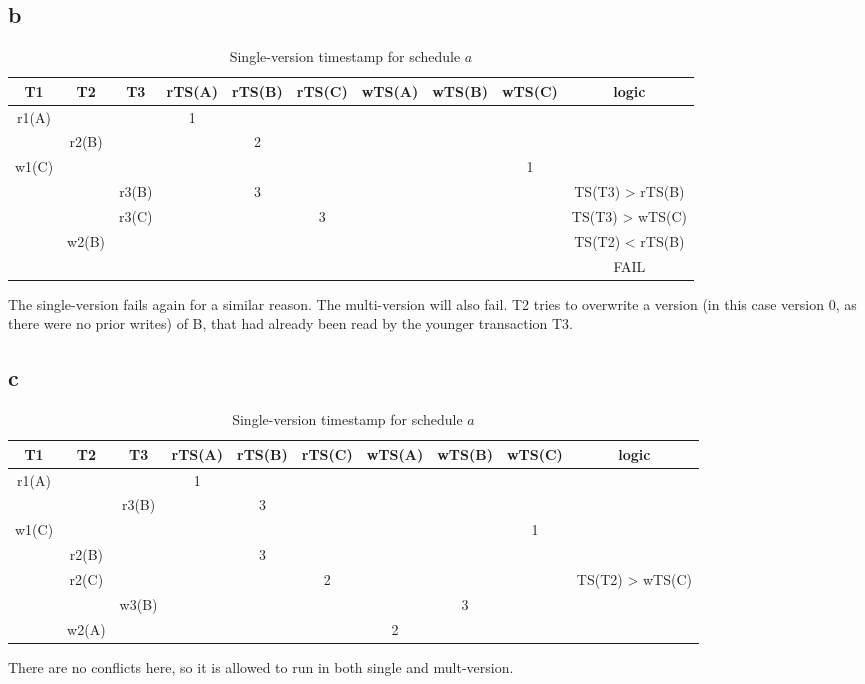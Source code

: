 \documentclass[working, oneside]{../../Preambles/tuftebook}
\begin{document}
\subsection*{b}
 \begin{table}[htpb]
    \centering
    \caption{Single-version timestamp for schedule $a$}
    \label{tab:label}
    \begin{tabular}{c|c|c|c|c|c|c|c|c|c}
        T1 & T2 & T3 & rTS(A) & rTS(B) & rTS(C) &  wTS(A) & wTS(B) & wTS(C) & logic \\ \hline
        r1(A) &  &  & 1 &  &  & & & \\
            & r2(B) &  &  & 2 &  & & &\\
          w1(C)  &  & &  &  &  & & & 1 & \\
                 & &r3(B)  &  & 3 &  & & &  & TS(T3) > rTS(B) \\
          &  & r3(C)&  &  & 3 & & &  & TS(T3) > wTS(C) \\
          & w2(B) & &  &  &  & & &  & TS(T2) < rTS(B) \\
          & & &  &  &  & & &  & FAIL\\
    \end{tabular}
\end{table}
The single-version fails again for a similar reason. The multi-version will also fail. T2 tries to overwrite a version (in this case version 0, as there were no prior writes) of B, that had already been read by the younger transaction T3. 
\subsection*{c}
 \begin{table}[htpb]
    \centering
    \caption{Single-version timestamp for schedule $a$}
    \label{tab:label}
    \begin{tabular}{c|c|c|c|c|c|c|c|c|c}
        T1 & T2 & T3 & rTS(A) & rTS(B) & rTS(C) &  wTS(A) & wTS(B) & wTS(C) & logic \\ \hline
        r1(A) &  &  & 1 &  &  & & & \\
            &  & r3(B)  &   & 3 &  & & &\\
          w1(C)  &  & &  &  &  & & & 1 & \\
                 & r2(B) &  & & 3 &  & & &  & \\
                 & r2(C) &  & &  & 2 & & &  & TS(T2) > wTS(C) \\
                 &  & w3(B) & &  &  & & 3 &  & \\
                 & w2(A) &  & &  &  &2 &  &  & \\
    \end{tabular}
\end{table}
There are no conflicts here, so it is allowed to run in both single and mult-version.
\end{document}
